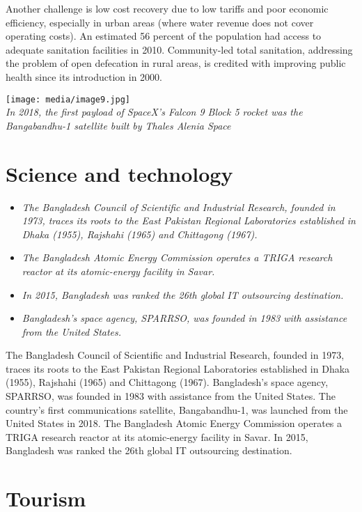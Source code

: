 Another challenge is low cost recovery due to low tariffs and poor
economic efficiency, especially in urban areas (where water revenue does
not cover operating costs). An estimated 56 percent of the population
had access to adequate sanitation facilities in 2010. Community-led
total sanitation, addressing the problem of open defecation in rural
areas, is credited with improving public health since its introduction
in 2000.

\texttt{[image: media/image9.jpg]}\\
\emph{In 2018, the first payload of SpaceX's Falcon 9 Block 5 rocket was
the Bangabandhu-1 satellite built by Thales Alenia Space}

\section{Science and technology}\label{science-and-technology}

\begin{itemize}
\item
  \emph{The Bangladesh Council of Scientific and Industrial Research,
  founded in 1973, traces its roots to the East Pakistan Regional
  Laboratories established in Dhaka (1955), Rajshahi (1965) and
  Chittagong (1967).}
\item
  \emph{The Bangladesh Atomic Energy Commission operates a TRIGA
  research reactor at its atomic-energy facility in Savar.}
\item
  \emph{In 2015, Bangladesh was ranked the 26th global IT outsourcing
  destination.}
\item
  \emph{Bangladesh's space agency, SPARRSO, was founded in 1983 with
  assistance from the United States.}
\end{itemize}

The Bangladesh Council of Scientific and Industrial Research, founded in
1973, traces its roots to the East Pakistan Regional Laboratories
established in Dhaka (1955), Rajshahi (1965) and Chittagong (1967).
Bangladesh's space agency, SPARRSO, was founded in 1983 with assistance
from the United States. The country's first communications satellite,
Bangabandhu-1, was launched from the United States in 2018. The
Bangladesh Atomic Energy Commission operates a TRIGA research reactor at
its atomic-energy facility in Savar. In 2015, Bangladesh was ranked the
26th global IT outsourcing destination.

\section{Tourism}\label{tourism}

